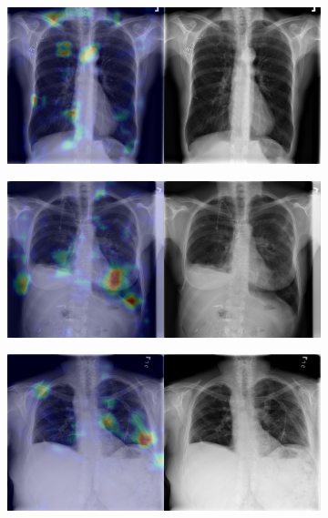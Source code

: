 \begin{figure}[b]
\begin{subfigure}{0.4\textwidth}
    \end{subfigure}
    \begin{subfigure}{0.4\textwidth}
        \centering
        \includegraphics[width=1.0\textwidth]{Chapters/5. Conclusiones/img/Emphysema/1_1_00001555_000.png}
    \end{subfigure}
    \begin{subfigure}{0.4\textwidth}
        \centering
        \includegraphics[width=1.0\textwidth]{Chapters/5. Conclusiones/img/Emphysema/1_1_00008841_062.png}
    \end{subfigure}
    \begin{subfigure}{0.4\textwidth}
        \centering
        \includegraphics[width=1.0\textwidth]{Chapters/5. Conclusiones/img/Emphysema/1_1_00011683_042.png}

\end{subfigure}
\end{figure}
